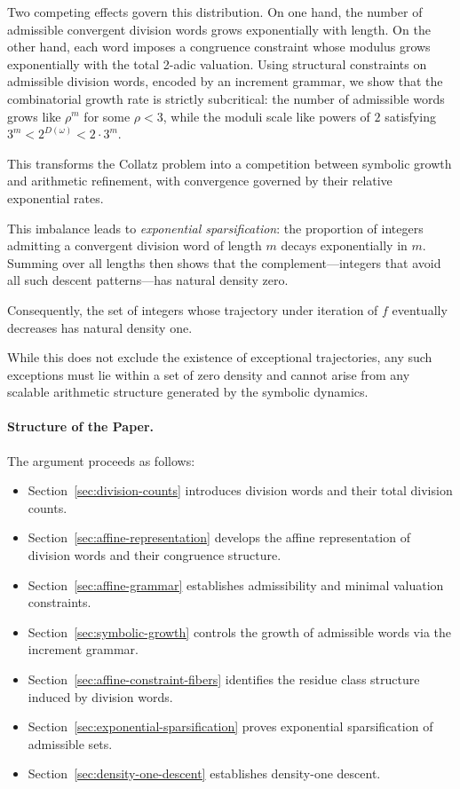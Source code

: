 \documentclass[12pt, oneside]{article}
\numberwithin{equation}{section}
\theoremstyle{definition}
\theoremstyle{plain}
\theoremstyle{remark}
\begin{document}
Two competing effects govern this distribution. On one hand, the number of admissible
convergent division words grows exponentially with length. On the other hand, each word
imposes a congruence constraint whose modulus grows exponentially with the total 2-adic
valuation. Using structural constraints on admissible division words, encoded by an
increment grammar, we show that the combinatorial growth rate is strictly subcritical:
the number of admissible words grows like $\rho^m$ for some $\rho < 3$, while the moduli
scale like powers of $2$ satisfying $3^m < 2^{D(\omega)} < 2\cdot 3^m$.

This transforms the Collatz problem into a competition between symbolic growth and
arithmetic refinement, with convergence governed by their relative exponential rates.

This imbalance leads to \emph{exponential sparsification}: the proportion of integers
admitting a convergent division word of length $m$ decays exponentially in $m$.
Summing over all lengths then shows that the complement—integers that avoid all such
descent patterns—has natural density zero.

Consequently, the set of integers whose trajectory under iteration of $f$ eventually
decreases has natural density one.

While this does not exclude the existence of exceptional trajectories, any such
exceptions must lie within a set of zero density and cannot arise from any scalable
arithmetic structure generated by the symbolic dynamics.

\paragraph{Structure of the Paper.}
The argument proceeds as follows:
\begin{itemize}
\item Section~\ref{sec:division-counts} introduces division words and their total division counts.
\item Section~\ref{sec:affine-representation} develops the affine representation of division words and their congruence structure.
\item Section~\ref{sec:affine-grammar} establishes admissibility and minimal valuation constraints.
\item Section~\ref{sec:symbolic-growth} controls the growth of admissible words via the increment grammar.
\item Section~\ref{sec:affine-constraint-fibers} identifies the residue class structure induced by division words.
\item Section~\ref{sec:exponential-sparsification} proves exponential sparsification of admissible sets.
\item Section~\ref{sec:density-one-descent} establishes density-one descent.
\end{itemize}
\end{document}
